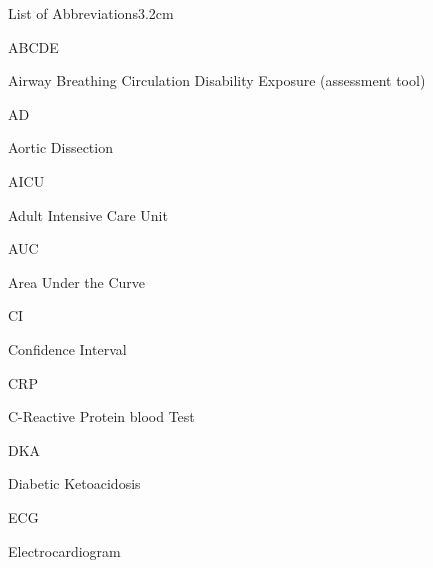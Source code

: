 \documentclass[a4paper, nobind]{templates/ociamthesis}
\begin{document}
\begin{romanpages}
\dominitoc %

\flushbottom

\tableofcontents

\listoffigures
	\mtcaddchapter

\listoftables
  \mtcaddchapter
\begin{mclistof}{List of Abbreviations}{3.2cm}

\item[ABCDE]

Airway Breathing Circulation Disability Exposure (assessment tool)

\item[AD]

Aortic Dissection

\item[AICU]

Adult Intensive Care Unit

\item[AUC]

Area Under the Curve

\item[CI]

Confidence Interval

\item[CRP]

C-Reactive Protein blood Test

\item[DKA]

Diabetic Ketoacidosis

\item[ECG]

Electrocardiogram


\end{mclistof}
\end{romanpages}
\end{document}
